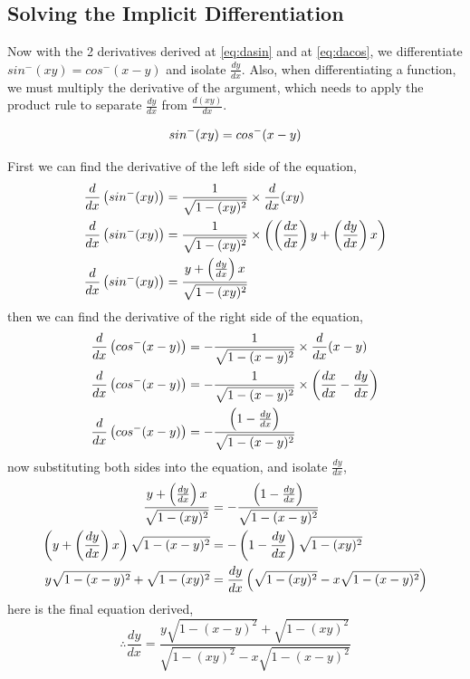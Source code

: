 \documentclass[12pt, titlepage]{article}
\begin{document}
    \subsection{Solving the Implicit Differentiation}
    Now with the 2 derivatives derived at \eqref{eq:dasin} and at \eqref{eq:dacos}, we differentiate $sin^{-}( xy) =cos^{-}( x-y)$ and isolate $\frac{dy}{dx}$. Also, when differentiating a function, we must multiply the derivative of the argument, which needs to apply the product rule to separate $\frac{dy}{dx}$ from $\frac{d(xy)}{dx}$.

    \begin{equation}
        \centering
            sin^{-}( xy) =cos^{-}( x-y)
    \end{equation}
    
    First we can find the derivative of the left side of the equation, 
    \begin{align}
        \centering
        \frac{d}{dx}\left( sin^{-}( xy)\right) &=\frac{1}{\sqrt{1-( xy)^{2}}} \times \frac{d}{dx}( xy)\\
        \frac{d}{dx}\left( sin^{-}( xy)\right) &=\frac{1}{\sqrt{1-( xy)^{2}}} \times \left(\left(\frac{dx}{dx}\right) y+\left(\frac{dy}{dx}\right) x\right)\\
        \frac{d}{dx}\left( sin^{-}( xy)\right) &=\frac{y+\left(\frac{dy}{dx}\right) x}{\sqrt{1-( xy)^{2}}}
    \end{align}
    then we can find the derivative of the right side of the equation,
    \begin{align}
        \centering
        \frac{d}{dx}\left( cos^{-}( x-y)\right) &=-\frac{1}{\sqrt{1-( x-y)^{2}}} \times \frac{d}{dx}( x-y)\\
            \frac{d}{dx}\left( cos^{-}( x-y)\right) &=-\frac{1}{\sqrt{1-( x-y)^{2}}} \times \left(\frac{dx}{dx} -\frac{dy}{dx}\right)\\
            \frac{d}{dx}\left( cos^{-}( x-y)\right) &=-\frac{\left( 1-\frac{dy}{dx}\right)}{\sqrt{1-( x-y)^{2}}}
    \end{align}
    now substituting both sides into the equation, and isolate $\frac{dy}{dx}$,
    \begin{align}
    \centering
        \frac{y+\left(\frac{dy}{dx}\right) x}{\sqrt{1-( xy)^{2}}} &=-\frac{\left( 1-\frac{dy}{dx}\right)}{\sqrt{1-( x-y)^{2}}}\\
        \left( y+\left(\frac{dy}{dx}\right) x\right)\sqrt{1-( x-y)^{2}} &=-\left( 1-\frac{dy}{dx}\right)\sqrt{1-( xy)^{2}}\\
        y\sqrt{1-( x-y)^{2}} +\sqrt{1-( xy)^{2}} &=\frac{dy}{dx}\left(\sqrt{1-( xy)^{2}} -x\sqrt{1-( x-y)^{2}}\right)
    \end{align}
    here is the final equation derived,
    \begin{equation}
        \therefore \frac{dy}{dx} =\frac{y\sqrt{1-( x-y)^{2}} +\sqrt{1-( xy)^{2}}}{\sqrt{1-( xy)^{2}} -x\sqrt{1-( x-y)^{2}}}
    \end{equation}
\end{document}
